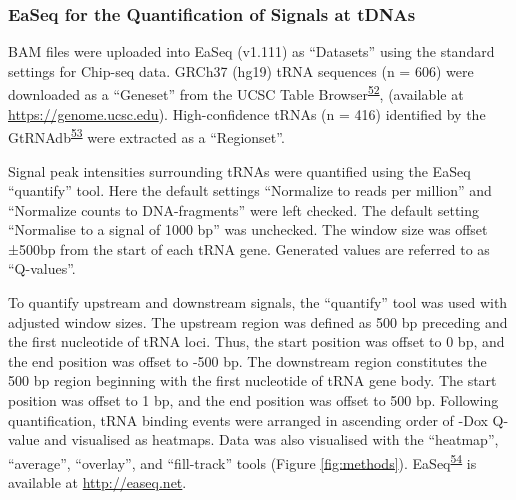 \documentclass[
  12pt,
]{article}
\begin{document}
\hypertarget{easeq-for-the-quantification-of-signals-at-tdnas}{%
\subsubsection{EaSeq for the Quantification of Signals at tDNAs}\label{easeq-for-the-quantification-of-signals-at-tdnas}}

BAM files were uploaded into EaSeq (v1.111) as ``Datasets'' using the standard settings for Chip-seq data.
GRCh37 (hg19) tRNA sequences (n = 606) were downloaded as a ``Geneset'' from the UCSC Table Browser\textsuperscript{\protect\hyperlink{ref-Karolchik2004}{52}}, (available at \url{https://genome.ucsc.edu}).
High-confidence tRNAs (n = 416) identified by the GtRNAdb\textsuperscript{\protect\hyperlink{ref-Chan2016}{53}} were extracted as a ``Regionset''.

Signal peak intensities surrounding tRNAs were quantified using the EaSeq ``quantify'' tool.
Here the default settings ``Normalize to reads per million'' and ``Normalize counts to DNA-fragments'' were left checked.
The default setting ``Normalise to a signal of 1000 bp'' was unchecked.
The window size was offset ±500bp from the start of each tRNA gene.
Generated values are referred to as ``Q-values''.

To quantify upstream and downstream signals, the ``quantify'' tool was used with adjusted window sizes.
The upstream region was defined as 500 bp preceding and the first nucleotide of tRNA loci.
Thus, the start position was offset to 0 bp, and the end position was offset to -500 bp.
The downstream region constitutes the 500 bp region beginning with the first nucleotide of tRNA gene body.
The start position was offset to 1 bp, and the end position was offset to 500 bp.
Following quantification, tRNA binding events were arranged in ascending order of -Dox Q-value and visualised as heatmaps.
Data was also visualised with the ``heatmap'', ``average'', ``overlay'', and ``fill-track'' tools (Figure \ref{fig:methods}).
EaSeq\textsuperscript{\protect\hyperlink{ref-lerdrup2016}{54}} is available at \url{http://easeq.net}.
\end{document}
